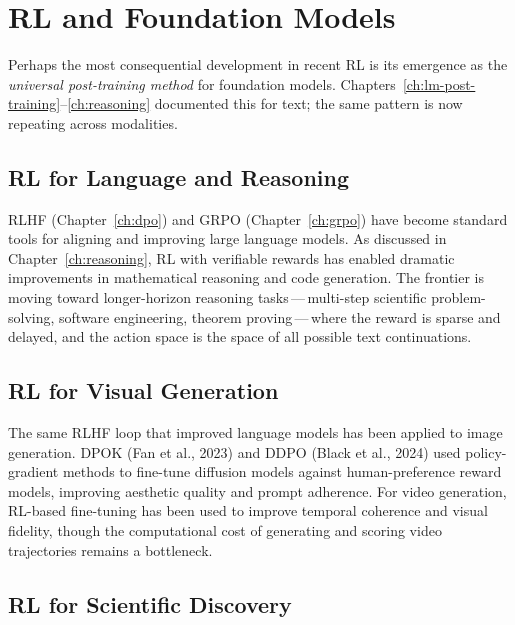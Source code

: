 \section{RL and Foundation Models}
\label{sec:open-foundation}

Perhaps the most consequential development in recent RL is its
emergence as the \emph{universal post-training method} for foundation
models.  Chapters~\ref{ch:lm-post-training}--\ref{ch:reasoning}
documented this for text; the same pattern is now repeating across
modalities.

\subsection{RL for Language and Reasoning}

RLHF (Chapter~\ref{ch:dpo}) and GRPO (Chapter~\ref{ch:grpo}) have
become standard tools for aligning and improving large language models.
As discussed in Chapter~\ref{ch:reasoning}, RL with verifiable rewards
has enabled dramatic improvements in mathematical reasoning and code
generation.  The frontier is moving toward longer-horizon reasoning
tasks\,---\,multi-step scientific problem-solving, software
engineering, theorem proving\,---\,where the reward is sparse and
delayed, and the action space is the space of all possible text
continuations.

\subsection{RL for Visual Generation}

The same RLHF loop that improved language models has been applied to
image generation.  DPOK (Fan et al., 2023) and DDPO (Black et al.,
2024) used policy-gradient methods to fine-tune diffusion models
against human-preference reward models, improving aesthetic quality and
prompt adherence.  For video generation, RL-based fine-tuning has been
used to improve temporal coherence and visual fidelity, though the
computational cost of generating and scoring video trajectories remains
a bottleneck.

\subsection{RL for Scientific Discovery}

